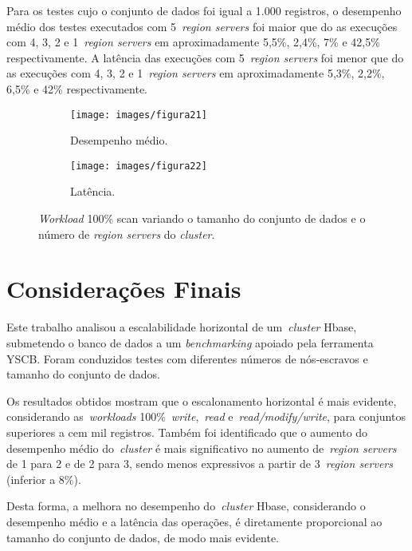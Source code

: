\documentclass[12pt]{article}
\begin{document}
Para os testes cujo o conjunto de dados foi igual a 1.000 registros, o desempenho médio dos testes executados com 5~\emph{region servers} foi maior que do as execuções com 4, 3, 2 e 1~\emph{region servers} em aproximadamente 5,5\%, 2,4\%, 7\% e 42,5\% respectivamente. A latência das execuções com 5~\emph{region servers} foi menor que do as execuções com 4, 3, 2 e 1~\emph{region servers} em aproximadamente 5,3\%, 2,2\%, 6,5\% e 42\% respectivamente.


\begin{figure*}
    \centering
    \begin{subfigure}[b]{0.49\textwidth}   
        \centering 
        \texttt{[image: images/figura21]}
        \caption{Desempenho médio.}
        \label{figura21}
    \end{subfigure}
    \begin{subfigure}[b]{0.49\textwidth}   
        \centering 
        \texttt{[image: images/figura22]}
        \caption{Latência.}
        \label{figura22}
    \end{subfigure}
    \caption{\emph{Workload} 100\% scan variando o tamanho do conjunto de dados e o número de \emph{region servers} do \emph{cluster}.}
\end{figure*}

\section{Considerações Finais}
\label{sec:finais}

Este trabalho analisou a escalabilidade horizontal de um~\emph{cluster}  Hbase, submetendo o banco de dados a um \textit{benchmarking} apoiado pela ferramenta YSCB. Foram conduzidos testes com diferentes números de nós-escravos e tamanho do conjunto de dados.

Os resultados obtidos mostram que o escalonamento horizontal é mais evidente, considerando as~\emph{workloads} 100\%~\emph{write},~\emph{read} e~\emph{read/modify/write}, para conjuntos superiores a cem mil registros. Também foi identificado que o aumento do desempenho médio do~\emph{cluster}  é mais significativo no aumento de~\emph{region servers} de 1 para 2 e de 2 para 3, sendo menos expressivos a partir de 3~\emph{region servers} (inferior a 8\%).

Desta forma, a melhora no desempenho do~\emph{cluster} Hbase, considerando o desempenho médio e a latência das operações, é diretamente proporcional ao tamanho do conjunto de dados, de modo mais evidente. 
\end{document}
